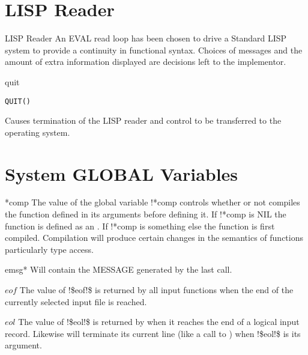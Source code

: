 \section{LISP Reader}
\begin{Introduction}{LISP Reader}
An EVAL read loop has been chosen to drive a Standard LISP system to
provide a continuity in functional syntax. Choices of messages and the
amount of extra information displayed are decisions left to the
implementor.
\end{Introduction}

\begin{Function}{quit}
\begin{verbatim}
QUIT()
\end{verbatim}
Causes termination of the LISP reader and control to be transferred
to the operating system.
\end{Function}

\section{System GLOBAL Variables}


\begin{Variable}{*comp}
The value of the global variable !*comp controls whether or not 
 compiles the
function defined in its arguments before defining it. If !*comp is NIL
the function is defined as an . If !*comp is something else the
function is first compiled. Compilation will produce certain changes
in the semantics of functions particularly  type access.
\end{Variable}


\begin{Variable}{emsg*}
Will contain the MESSAGE generated by the last  call.
\end{Variable}


\begin{Variable}{$eof$}
The value of !\$eof!\$ is returned by all input functions when the
end 
of the currently selected input file is reached.
\end{Variable}


\begin{Variable}{$eol$}
The value of !\$eol!\$ is returned by  when it reaches the end
of  
a logical input record. Likewise  will terminate its current line
(like a call to ) when !\$eol!\$ is its argument.
\end{Variable}

